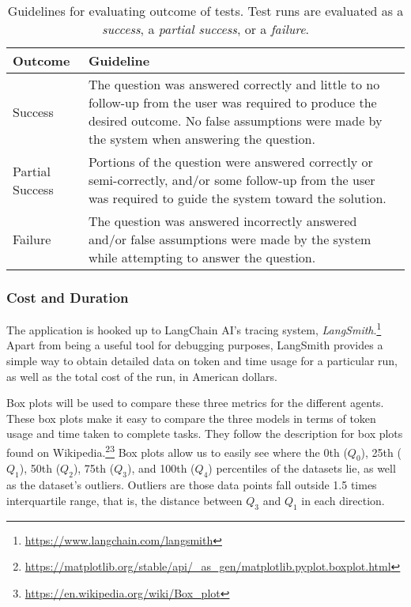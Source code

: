 \begin{table}[htbp]
    \centering
    \caption[Guidelines for evaluating outcome of tests]{Guidelines for evaluating outcome of tests. Test runs are evaluated as a \textit{success}, a \textit{partial success}, or a \textit{failure}.}
    \label{tbl:test-outcome-enum}
    \begin{tabularx}{0.9\textwidth}{p{3cm}X}
        \toprule
        \textbf{Outcome} & \textbf{Guideline}                                                                                                                                                                                  \\
        \midrule
        Success          & The question was answered correctly and little to no follow-up from the user was required to produce the desired outcome. No false assumptions were made by the system when answering the question. \\
        Partial Success  & Portions of the question were answered correctly or semi-correctly, and/or some follow-up from the user was required to guide the system toward the solution.                                       \\
        Failure          & The question was answered incorrectly answered and/or false assumptions were made by the system while attempting to answer the question.                                                            \\
        \bottomrule
    \end{tabularx}
\end{table}


\subsubsection{Cost and Duration}
\label{subsubsec:cost-and-duration}

The application is hooked up to LangChain AI's tracing system, \textit{LangSmith}.\footnote{\url{https://www.langchain.com/langsmith}} Apart from being a useful tool for debugging purposes, LangSmith provides a simple way to obtain detailed data on token and time usage for a particular run, as well as the total cost of the run, in American dollars.

Box plots will be used to compare these three metrics for the different agents. These box plots make it easy to compare the three models in terms of token usage and time taken to complete tasks. They follow the description for box plots found on Wikipedia.\footnote{\url{https://matplotlib.org/stable/api/_as_gen/matplotlib.pyplot.boxplot.html}}\footnote{\url{https://en.wikipedia.org/wiki/Box_plot}} Box plots allow us to easily see where the 0th ($Q_0$), 25th ($Q_1$), 50th ($Q_2$), 75th ($Q_3$), and 100th ($Q_4$) percentiles of the datasets lie, as well as the dataset's outliers. Outliers are those data points fall outside 1.5 times interquartile range, that is, the distance between $Q_3$ and $Q_1$ in each direction.

